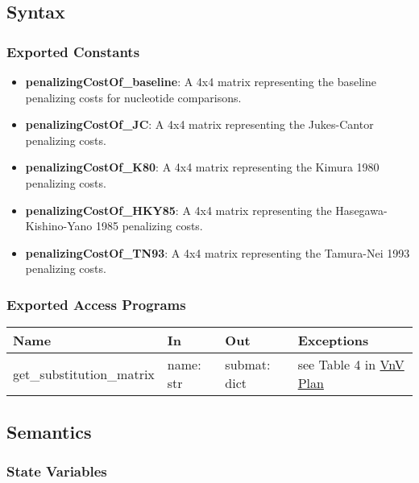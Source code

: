 \documentclass[12pt, titlepage]{article}
\begin{document}
\subsection{Syntax}

\subsubsection{Exported Constants}

\begin{itemize}
    \item \textbf{penalizingCostOf\_baseline}: A 4x4 matrix representing the baseline penalizing costs for nucleotide comparisons.
    \item \textbf{penalizingCostOf\_JC}: A 4x4 matrix representing the Jukes-Cantor penalizing costs.
    \item \textbf{penalizingCostOf\_K80}: A 4x4 matrix representing the Kimura 1980 penalizing costs.
    \item \textbf{penalizingCostOf\_HKY85}: A 4x4 matrix representing the Hasegawa-Kishino-Yano 1985 penalizing costs.
    \item \textbf{penalizingCostOf\_TN93}: A 4x4 matrix representing the Tamura-Nei 1993 penalizing costs.
\end{itemize}

\subsubsection{Exported Access Programs}

\begin{center}
\begin{tabular}{p{4cm} p{4cm} p{3cm} p{2cm}}
\hline
\textbf{Name} & \textbf{In} & \textbf{Out} & \textbf{Exceptions} \\
\hline
get\_substitution\_matrix & name: str & submat: dict & see Table 4 in \href{https://github.com/UGarCil/UGarcil_capstone/blob/main/docs/VnVPlan/VnVPlan.pdf}{VnV Plan} \\
\hline
\end{tabular}
\end{center}

\subsection{Semantics}

\subsubsection{State Variables}
\end{document}
